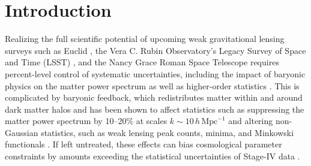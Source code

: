 \documentclass[linenumbers,trackchanges]{aastex701}
\begin{document}


\section{Introduction}
\label{sec:intro}

Realizing the full scientific potential of upcoming weak gravitational lensing surveys such as Euclid \citep{Euclid11}, the Vera C. Rubin Observatory’s Legacy Survey of Space and Time (LSST) \citep{LSST}, and the Nancy Grace Roman Space Telescope \citep{Roman15} requires percent-level control of systematic uncertainties, including the impact of baryonic physics on the matter power spectrum as well as higher-order statistics \citep{Chisari19}. This is complicated by baryonic feedback, which redistributes matter within and around dark matter halos \citep{schaye10, McCarthy17, Volker10, Nelson2019, hadzhiyska_evidence_2024, bigwood2024weaklensingcombinedkinetic} and has been shown to affect statistics such as suppressing the matter power spectrum by 10–20\% at scales $k \sim 10\,h\,\mathrm{Mpc}^{-1}$ \citep{Arico2020, Osato21} and altering non-Gaussian statistics, such as weak lensing peak counts, minima, and Minkowski functionals \citep{jain00, Liu15, Martinet2021, leeComparingWeakLensing2022}. If left untreated, these effects can bias cosmological parameter constraints by amounts exceeding the statistical uncertainties of Stage-IV data \citep{Hikage19, Hamana20, Amon-2020, DES21, Abbott22, Abbot-26}.
\end{document}
